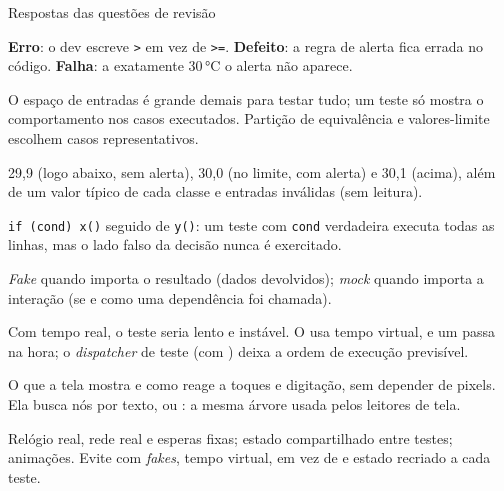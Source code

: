 \documentclass[aspectratio=169,10pt]{beamer}
\begin{document}
\begin{frame}{Respostas das questões de revisão}
  \begin{respostas}
    \item \textbf{Erro}: o dev escreve \texttt{>} em vez de \texttt{>=}. \textbf{Defeito}: a regra de alerta fica errada no código. \textbf{Falha}: a exatamente 30\,°C o alerta não aparece.
    \item O espaço de entradas é grande demais para testar tudo; um teste só mostra o comportamento nos casos executados. Partição de equivalência e valores-limite escolhem casos representativos.
    \item 29,9 (logo abaixo, sem alerta), 30,0 (no limite, com alerta) e 30,1 (acima), além de um valor típico de cada classe e entradas inválidas (sem leitura).
    \item \texttt{if (cond) x()} seguido de \texttt{y()}: um teste com \texttt{cond} verdadeira executa todas as linhas, mas o lado falso da decisão nunca é exercitado.
    \item \emph{Fake} quando importa o resultado (dados devolvidos); \emph{mock} quando importa a interação (se e como uma dependência foi chamada).
    \item Com tempo real, o teste seria lento e instável. O  usa tempo virtual, e um  passa na hora; o \emph{dispatcher} de teste (com ) deixa a ordem de execução previsível.
    \item O que a tela mostra e como reage a toques e digitação, sem depender de pixels. Ela busca nós por texto,  ou : a mesma árvore usada pelos leitores de tela.
    \item Relógio real, rede real e esperas fixas; estado compartilhado entre testes; animações. Evite com \emph{fakes}, tempo virtual,  em vez de  e estado recriado a cada teste.
  \end{respostas}
\end{frame}

\end{document}
